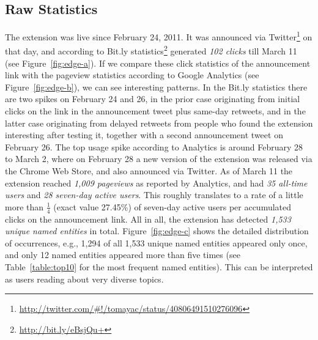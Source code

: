 \documentclass[runningheads,a4paper]{llncs}
\begin{document}
\subsection{Raw Statistics}
The extension was live since February 24, 2011. It was announced via Twitter\footnote{\url{http://twitter.com/#!/tomayac/status/40806491510276096}} on that day, and according to Bit.ly statistics\footnote{\url{http://bit.ly/eBsjQu+}} generated \textit{102 clicks} till March 11 (see Figure~\ref{fig:edge-a}). If we compare these click statistics of the announcement link with the pageview statistics according to Google Analytics (see Figure~\ref{fig:edge-b}), we can see interesting patterns. In the Bit.ly statistics there are two spikes on February 24 and 26, in the prior case originating from initial clicks on the link in the announcement tweet plus same-day retweets, and in the latter case originating from delayed retweets from people who found the extension interesting after testing it, together with a second announcement tweet on February 26. The top usage spike according to Analytics is around February 28 to March 2, where on February 28 a new version of the extension was released via the Chrome Web Store, and also announced via Twitter. As of March 11 the extension reached \textit{1,009 pageviews} as reported by Analytics, and had \textit{35 all-time users} and \textit{28 seven-day active users}. This roughly translates to a rate of a little more than $\frac{1}{4}$ (exact value 27.45\%) of seven-day active users per accumulated clicks on the announcement link. All in all, the extension has detected \textit{1,533 unique named entities} in total. Figure~\ref{fig:edge-c} shows the detailed distribution of occurrences, e.g., 1,294 of all 1,533 unique named entities appeared only once, and only 12 named entities appeared more than five times (see Table~\ref{table:top10} for the most frequent named entities).  This can be interpreted as users reading about very diverse topics.

\end{document}
